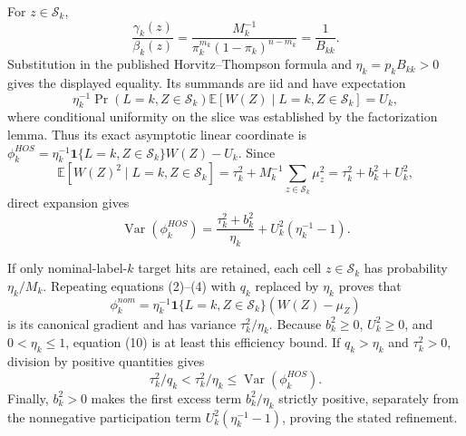 For \(z\in\mathcal S_k\),
\[
 \frac{\gamma_k(z)}{\beta_k(z)}
 =\frac{M_k^{-1}}{\pi_k^{m_k}(1-\pi_k)^{n-m_k}}
 =\frac1{B_{kk}}.
\]
Substitution in the published Horvitz--Thompson formula and \(\eta_k=p_kB_{kk}>0\) gives the displayed equality.  Its summands are iid and have expectation
\[
 \eta_k^{-1}\Pr(L=k,Z\in\mathcal S_k)
 \mathbb E[W(Z)\mid L=k,Z\in\mathcal S_k]=U_k,
\]
where conditional uniformity on the slice was established by the factorization lemma.  Thus its exact asymptotic linear coordinate is
\(\phi_k^{HOS}=\eta_k^{-1}{\mathbf 1}\{L=k,Z\in\mathcal S_k\}W(Z)-U_k\).  Since
\[
 \mathbb E[W(Z)^2\mid L=k,Z\in\mathcal S_k]
 =\tau_k^2+M_k^{-1}\sum_{z\in\mathcal S_k}\mu_z^2
 =\tau_k^2+b_k^2+U_k^2,
\]
direct expansion gives
\[
 \operatorname{Var}(\phi_k^{HOS})
 =\frac{\tau_k^2+b_k^2}{\eta_k}+U_k^2(\eta_k^{-1}-1). \tag{10}
\]

If only nominal-label-\(k\) target hits are retained, each cell \(z\in\mathcal S_k\) has probability \(\eta_k/M_k\).  Repeating equations (2)--(4) with \(q_k\) replaced by \(\eta_k\) proves that
\[
 \phi_k^{nom}=\eta_k^{-1}{\mathbf 1}\{L=k,Z\in\mathcal S_k\}(W(Z)-\mu_Z)
\]
is its canonical gradient and has variance \(\tau_k^2/\eta_k\).  Because \(b_k^2\geq0\), \(U_k^2\geq0\), and \(0<\eta_k\leq1\), equation (10) is at least this efficiency bound.  If \(q_k>\eta_k\) and \(\tau_k^2>0\), division by positive quantities gives
\[
 \tau_k^2/q_k<\tau_k^2/\eta_k\leq\operatorname{Var}(\phi_k^{HOS}).
\]
Finally, \(b_k^2>0\) makes the first excess term \(b_k^2/\eta_k\) strictly positive, separately from the nonnegative participation term \(U_k^2(\eta_k^{-1}-1)\), proving the stated refinement.